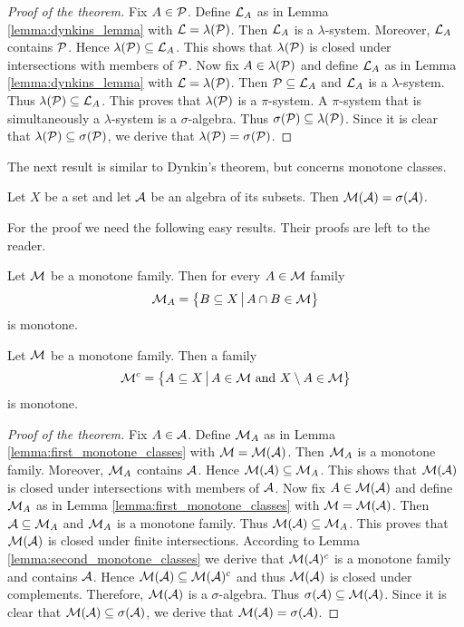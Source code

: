 \begin{proof}[Proof of the theorem]
    Fix $A\in {\mathcal P}$. Define ${\mathcal L}_A$ as in Lemma \ref{lemma:dynkins_lemma} with ${\mathcal L} = \lambda({\mathcal P})$. Then ${\mathcal L}_A$ is a $\lambda$-system. Moreover, ${\mathcal L}_A$ contains ${\mathcal P}$. Hence $\lambda({\mathcal P})\subseteq {\mathcal L}_A$. This shows that $\lambda({\mathcal P})$ is closed under intersections with members of ${\mathcal P}$. Now fix $A\in \lambda({\mathcal P})$ and define ${\mathcal L}_A$ as in Lemma \ref{lemma:dynkins_lemma} with ${\mathcal L} = \lambda({\mathcal P})$. Then ${\mathcal P} \subseteq {\mathcal L}_A$ and ${\mathcal L}_A$ is a $\lambda$-system. Thus $\lambda({\mathcal P})\subseteq {\mathcal L}_A$. This proves that $\lambda({\mathcal P})$ is a $\pi$-system. A $\pi$-system that is simultaneously a $\lambda$-system is a $\sigma$-algebra. Thus $\sigma({\mathcal P})\subseteq \lambda({\mathcal P})$. Since it is clear that $\lambda({\mathcal P}) \subseteq \sigma({\mathcal P})$, we derive that $\lambda({\mathcal P})=\sigma({\mathcal P})$.
\end{proof}
\noindent
The next result is similar to Dynkin's theorem, but concerns monotone classes.

\begin{theorem}\label{theorem:monotone_classes}
    Let $X$ be a set and let ${\mathcal A}$ be an algebra of its subsets. Then ${\mathcal M}({\mathcal A})=\sigma({\mathcal A})$.
\end{theorem}
\noindent
For the proof we need the following easy results. Their proofs are left to the reader.

\begin{lemma}\label{lemma:first_monotone_classes}
    Let ${\mathcal M}$ be a monotone family. Then for every $A \in {\mathcal M}$ family
    $${\mathcal M}_A = \big\{B\subseteq X\,\big|\,A\cap B\in {\mathcal M}\big\}$$
    is monotone.
\end{lemma}

\begin{lemma}\label{lemma:second_monotone_classes}
    Let ${\mathcal M}$ be a monotone family. Then a family
    $${\mathcal M}^c= \big\{A \subseteq X \,\big|\,A\in {\mathcal M}\mbox{ and }X\setminus A\in {\mathcal M}\big\}$$
    is monotone.
\end{lemma}

\begin{proof}[Proof of the theorem]
    Fix $A\in {\mathcal A}$. Define ${\mathcal M}_A$ as in Lemma \ref{lemma:first_monotone_classes} with ${\mathcal M} = {\mathcal M}({\mathcal A})$. Then ${\mathcal M}_A$ is a monotone family. Moreover, ${\mathcal M}_A$ contains ${\mathcal A}$. Hence ${\mathcal M}({\mathcal A})\subseteq {\mathcal M}_A$. This shows that ${\mathcal M}({\mathcal A})$ is closed under intersections with members of ${\mathcal A}$. Now fix $A\in {\mathcal M}({\mathcal A})$ and define ${\mathcal M}_A$ as in Lemma \ref{lemma:first_monotone_classes} with ${\mathcal M} = {\mathcal M}({\mathcal A})$. Then ${\mathcal A} \subseteq {\mathcal M}_A$ and ${\mathcal M}_A$ is a monotone family. Thus ${\mathcal M}({\mathcal A})\subseteq {\mathcal M}_A$. This proves that ${\mathcal M}({\mathcal A})$ is closed under finite intersections. According to Lemma \ref{lemma:second_monotone_classes} we derive that ${\mathcal M}({\mathcal A})^c$ is a monotone family and contains ${\mathcal A}$. Hence ${\mathcal M}({\mathcal A})\subseteq {\mathcal M}({\mathcal A})^c$ and thus ${\mathcal M}({\mathcal A})$ is closed under complements. Therefore, ${\mathcal M}({\mathcal A})$ is a $\sigma$-algebra. Thus $\sigma({\mathcal A})\subseteq {\mathcal M}({\mathcal A})$. Since it is clear that ${\mathcal M}({\mathcal A}) \subseteq \sigma({\mathcal A})$, we derive that ${\mathcal M}({\mathcal A}) = \sigma({\mathcal A})$.
\end{proof}

